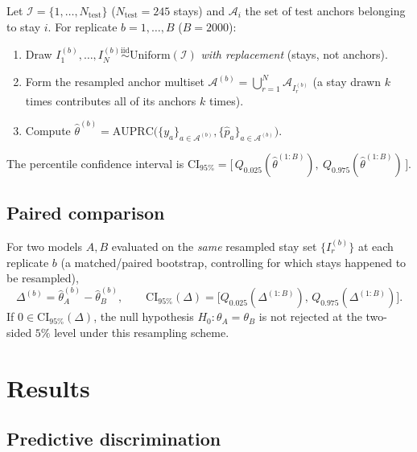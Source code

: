 \documentclass[11pt]{article}
\newcommand{\1}[1]{\mathbf{1}\!\left[#1\right]}
\begin{document}
Let $\mathcal I = \{1,\dots,N_{\mathrm{test}}\}$ ($N_{\mathrm{test}}=245$ stays) and $\mathcal A_i$ the set of test anchors belonging to stay $i$. For replicate $b=1,\dots,B$ ($B=2000$):
\begin{enumerate}[label=(\roman*)]
\item Draw $I_1^{(b)},\dots,I_N^{(b)} \overset{\mathrm{iid}}{\sim} \mathrm{Uniform}(\mathcal I)$ \emph{with replacement} (stays, not anchors).
\item Form the resampled anchor multiset $\mathcal A^{(b)} = \bigcup_{r=1}^{N} \mathcal A_{I_r^{(b)}}$ (a stay drawn $k$ times contributes all of its anchors $k$ times).
\item Compute $\hat\theta^{(b)} = \mathrm{AUPRC}\big(\{y_a\}_{a\in\mathcal A^{(b)}}, \{\hat p_a\}_{a\in\mathcal A^{(b)}}\big)$.
\end{enumerate}
The percentile confidence interval is $\mathrm{CI}_{95\%} = \big[\,Q_{0.025}(\hat\theta^{(1:B)}),\ Q_{0.975}(\hat\theta^{(1:B)})\,\big]$.

\subsection{Paired comparison}

For two models $A,B$ evaluated on the \emph{same} resampled stay set $\{I_r^{(b)}\}$ at each replicate $b$ (a matched/paired bootstrap, controlling for which stays happened to be resampled),
\begin{equation}
\Delta^{(b)} = \hat\theta_A^{(b)} - \hat\theta_B^{(b)}, \qquad \mathrm{CI}_{95\%}(\Delta) = \big[Q_{0.025}(\Delta^{(1:B)}),\,Q_{0.975}(\Delta^{(1:B)})\big].
\end{equation}
If $0 \in \mathrm{CI}_{95\%}(\Delta)$, the null hypothesis $H_0: \theta_A=\theta_B$ is not rejected at the two-sided $5\%$ level under this resampling scheme.

\section{Results}

\subsection{Predictive discrimination}
\end{document}

